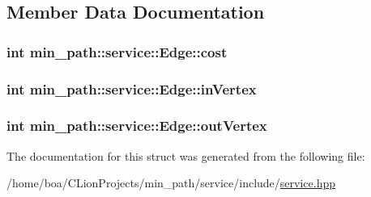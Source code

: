 \subsection{Member Data Documentation}
\subsubsection[{\texorpdfstring{cost}{cost}}]{\setlength{\rightskip}{0pt plus 5cm}int min\+\_\+path\+::service\+::\+Edge\+::cost}\hypertarget{a00004_ab46c0741b12aad4e05a46a854cd8500f_ab46c0741b12aad4e05a46a854cd8500f}{}\label{a00004_ab46c0741b12aad4e05a46a854cd8500f_ab46c0741b12aad4e05a46a854cd8500f}
\subsubsection[{\texorpdfstring{in\+Vertex}{inVertex}}]{\setlength{\rightskip}{0pt plus 5cm}int min\+\_\+path\+::service\+::\+Edge\+::in\+Vertex}\hypertarget{a00004_ae5f860082c48acb267ddf2bbed3d762e_ae5f860082c48acb267ddf2bbed3d762e}{}\label{a00004_ae5f860082c48acb267ddf2bbed3d762e_ae5f860082c48acb267ddf2bbed3d762e}
\subsubsection[{\texorpdfstring{out\+Vertex}{outVertex}}]{\setlength{\rightskip}{0pt plus 5cm}int min\+\_\+path\+::service\+::\+Edge\+::out\+Vertex}\hypertarget{a00004_a7162f7cb4b4bfa81225f2a6be16b770a_a7162f7cb4b4bfa81225f2a6be16b770a}{}\label{a00004_a7162f7cb4b4bfa81225f2a6be16b770a_a7162f7cb4b4bfa81225f2a6be16b770a}


The documentation for this struct was generated from the following file\+:\begin{DoxyCompactItemize}
\item 
/home/boa/\+C\+Lion\+Projects/min\+\_\+path/service/include/\hyperlink{a00030}{service.\+hpp}\end{DoxyCompactItemize}
